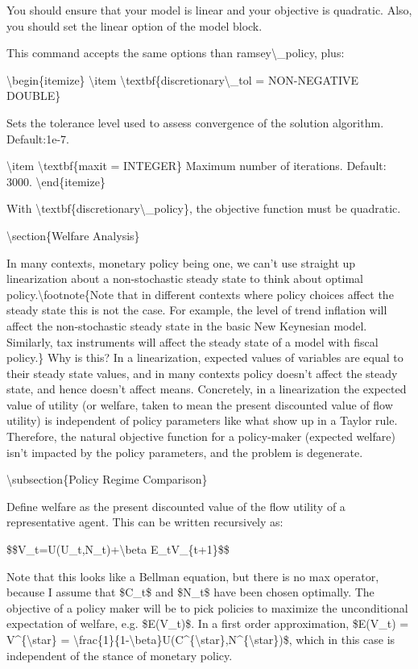\documentclass[10pt,math=newtx,citestyle=gb7714-2015,bibstyle=gb7714-2015]{elegantbook}
\begin{document}
	You should ensure that your model is linear and your objective is quadratic. Also, you should set the linear option of the model block.
	
	This command accepts the same options than ramsey\textbackslash{}\_policy, plus:
	
	\textbackslash{}begin\{itemize\}
	\textbackslash{}item \textbackslash{}textbf\{discretionary\textbackslash{}\_tol = NON-NEGATIVE DOUBLE\} 
	
	Sets the tolerance level used to assess convergence of the solution algorithm. Default:1e-7.
	
	\textbackslash{}item \textbackslash{}textbf\{maxit = INTEGER\} Maximum number of iterations. Default: 3000.
	\textbackslash{}end\{itemize\}
	
	With \textbackslash{}textbf\{discretionary\textbackslash{}\_policy\}, the objective function must be quadratic.
	
	\textbackslash{}section\{Welfare Analysis\}
	
	In many contexts, monetary policy being one, we can't use straight up linearization about a non-stochastic steady state to think about optimal policy.\textbackslash{}footnote\{Note that in different contexts where policy choices affect the steady state this is not the case. For example, the level of trend inflation will affect the non-stochastic steady state in the basic New Keynesian model. Similarly, tax instruments will affect the steady state of a model with fiscal policy.\} Why is this? In a linearization, expected values of variables are equal to their steady state values, and in many contexts policy doesn't affect
	the steady state, and hence doesn't affect means. Concretely, in a linearization the expected value of utility (or welfare, taken to mean the present discounted value of flow utility) is independent of policy parameters like what show up in a Taylor rule. Therefore, the natural objective function for a policy-maker (expected welfare) isn't impacted by the policy parameters, and the problem is degenerate.
	
	
	
	\textbackslash{}subsection\{Policy Regime Comparison\}
	
	Define welfare as the present discounted value of the flow utility of a representative agent. This can be written recursively as:
	
	\$\$V\_t=U(U\_t,N\_t)+\textbackslash{}beta E\_tV\_\{t+1\}\$\$
	
	Note that this looks like a Bellman equation, but there is no max operator, because I assume that \$C\_t\$ and \$N\_t\$ have been chosen optimally. The objective of a policy maker will be to pick policies to maximize the unconditional expectation of welfare, e.g. \$E(V\_t)\$. In a first order approximation, \$E(V\_t) = V\^{}\{\textbackslash{}star\} = \textbackslash{}frac\{1\}\{1-\textbackslash{}beta\}U(C\^{}\{\textbackslash{}star\},N\^{}\{\textbackslash{}star\})\$, which in this case is independent of the stance of monetary policy.
	
\end{document}
